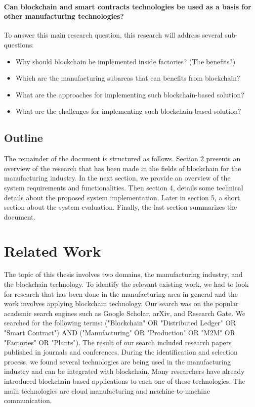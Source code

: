 \documentclass[runningheads]{llncs}
\begin{document}
\paragraph{Can blockchain and smart contracts technologies be used as a basis for other manufacturing technologies?} To answer this main research question, this research will address several sub-questions:
\begin{itemize}
  \item Why should blockchain be implemented inside factories? (The benefits?)
  \item Which are the manufacturing subareas that can benefits from blockchain?
  \item What are the approaches for implementing such blockchain-based solution? 
  \item What are the challenges for implementing such blockchain-based solution? 
\end{itemize}

\subsection{Outline}
The remainder of the document is structured as follows. Section 2 presents an overview of the research that has been made in the fields of blockchain for the manufacturing industry. In the next section, we provide an overview of the system requirements and functionalities. Then section 4, details some technical details about the proposed system implementation. Later in section 5, a short section about the system evaluation. Finally, the last section summarizes the document. 

\newpage

\section{Related Work}
The topic of this thesis involves two domains, the manufacturing industry, and the blockchain technology. To identify the relevant existing work, we had to look for research that has been done in the manufacturing area in general and the work involves applying blockchain technology. Our search was on the popular academic search engines such as Google Scholar, arXiv, and Research Gate. We searched for the following terms: ("Blockchain" OR "Distributed Ledger" OR "Smart Contract") AND ("Manufacturing" OR "Production" OR "M2M" OR "Factories" OR "Plants").  The result of our search included research papers published in journals and conferences. During the identification and selection process, we found several technologies are being used in the manufacturing industry and can be integrated with blockchain. Many researchers have already introduced blockchain-based applications to each one of these technologies. The main technologies are cloud manufacturing and machine-to-machine communication.  
\bigbreak
\end{document}
